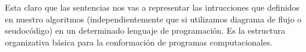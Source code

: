 Esta claro que las sentencias nos vas a representar las intrucciones que definidos en nuestro algoritmos (independientemente que si utilizamos diagrama de flujo o seudocódigo) en un determinado lenguaje de programación. Es la estructura organizativa básica para la conformación de programas computacionales.